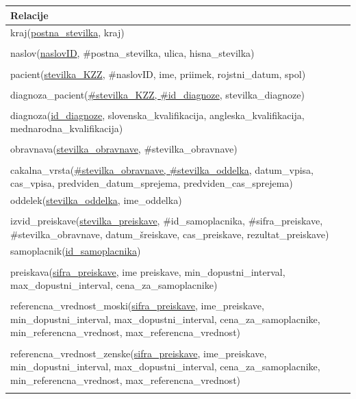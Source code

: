 \documentclass[a4paper,12pt]{report}
\begin{document}
\begin{center}
  \begin{tabular}{ ||p{15cm}|| }
    \hline
    Relacije \\
    \hline \hline
    kraj(\underline{postna\_stevilka}, kraj)\\ \\
    naslov(\underline{naslovID}, \#postna\_stevilka, ulica, hisna\_stevilka)\\ \\
    pacient(\underline{stevilka\_KZZ}, \#naslovID, ime, priimek, rojstni\_datum, spol)\\ \\
    diagnoza\_pacient(\underline{\#stevilka\_KZZ, \#id\_diagnoze}, stevilka\_diagnoze)\\ \\
    diagnoza(\underline{id\_diagnoze}, slovenska\_kvalifikacija, angleska\_kvalifikacija, mednarodna\_kvalifikacija)\\ \\
    obravnava(\underline{stevilka\_obravnave}, \#stevilka\_obravnave)\\ \\
    cakalna\_vrsta(\underline{\#stevilka\_obravnave, \#stevilka\_oddelka}, datum\_vpisa, cas\_vpisa, predviden\_datum\_sprejema, predviden\_cas\_sprejema)\\
    oddelek(\underline{stevilka\_oddelka}, ime\_oddelka)\\ \\
    izvid\_preiskave(\underline{stevilka\_preiskave}, \#id\_samoplacnika, \#sifra\_preiskave, \#stevilka\_obravnave, datum\_šreiskave, cas\_preiskave, rezultat\_preiskave)\\
    samoplacnik(\underline{id\_samoplacnika})\\ \\
    preiskava(\underline{sifra\_preiskave}, ime preiskave, min\_dopustni\_interval, max\_dopustni\_interval, cena\_za\_samoplacnike)\\ \\
    referencna\_vrednost\_moski(\underline{sifra\_preiskave}, ime\_preiskave, min\_dopustni\_interval, max\_dopustni\_interval, cena\_za\_samoplacnike, min\_referencna\_vrednost, max\_referencna\_vrednost)\\ \\
    referencna\_vrednost\_zenske(\underline{sifra\_preiskave}, ime\_preiskave, min\_dopustni\_interval, max\_dopustni\_interval, cena\_za\_samoplacnike, min\_referencna\_vrednost, max\_referencna\_vrednost)\\ \\
    \hline
  \end{tabular}
\end{center}
\end{document}
